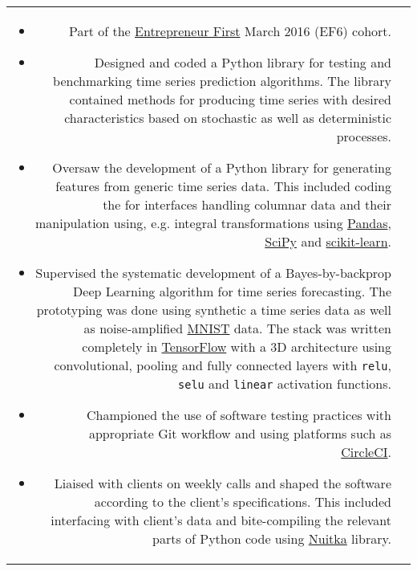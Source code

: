 \documentclass[a4paper,10pt]{article}
\begin{document}
\begin{tabular}{r|p{11cm}}
{\begin{itemize}
  \item Part of the \href{https://www.joinef.com/}{Entrepreneur First} March 2016 (EF6) cohort.
  \item Designed and coded a Python library for testing and benchmarking time series prediction algorithms.
  The library contained methods for producing time series with desired characteristics based on stochastic as well as
  deterministic processes.
  \item Oversaw the development of a Python library for generating features from generic time series data.
  This included coding the for interfaces handling columnar data and their manipulation using, e.g.
  integral transformations using \href{https://pandas.pydata.org/}{Pandas}, \href{https://www.scipy.org/}{SciPy}
  and \href{http://scikit-learn.org/stable/}{scikit-learn}.
  \item Supervised the systematic development of a Bayes-by-backprop Deep Learning algorithm for time
  series forecasting. The prototyping was done using synthetic a time series data as well as noise-amplified
  \href{http://yann.lecun.com/exdb/mnist/}{MNIST} data. The stack was written completely in
  \href{https://www.tensorflow.org/}{TensorFlow} with a 3D architecture using convolutional,
  pooling and fully connected layers with \texttt{relu}, \texttt{selu} and \texttt{linear} activation functions.
  \item Championed the use of software testing practices with appropriate Git workflow and using platforms such
  as \href{https://circleci.com/}{CircleCI}.
  \item Liaised with clients on weekly calls and shaped the software according to the client's specifications.
  This included interfacing with client's data and bite-compiling the relevant parts of Python code using
  \href{http://nuitka.net/}{Nuitka} library.


\end{itemize}}
\end{tabular}
\end{document}
